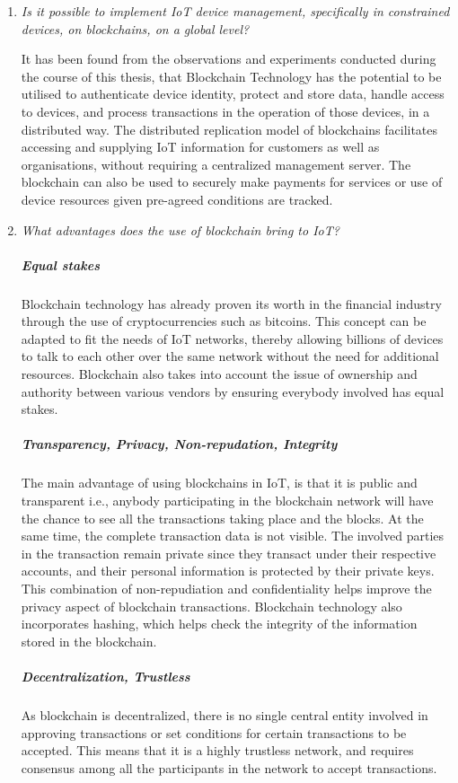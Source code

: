 \documentclass[english]{tktltiki}
\begin{document}
\begin{enumerate}
\item \textit{Is it possible to implement IoT device management, specifically in constrained devices, on blockchains, on a global level?}\newline

It has been found from the observations and experiments conducted during the course of this thesis, that Blockchain Technology has the potential to be utilised to authenticate device identity, protect and store data, handle access to devices, and process transactions in the operation of those devices, in a distributed way. The distributed replication model of blockchains facilitates accessing and supplying IoT information for customers as well as organisations, without requiring a centralized management server. The blockchain can also be used to securely make payments for services or use of device resources given pre-agreed conditions are tracked. 

\item \textit{What advantages does the use of blockchain bring to IoT?}

\subparagraph{Equal stakes} Blockchain technology has already proven its worth in the financial industry through the use of cryptocurrencies such as bitcoins. This concept can be adapted to fit the needs of IoT networks, thereby allowing billions of devices to talk to each other over the same network without the need for additional resources. Blockchain also takes into account the issue of ownership and authority between various vendors by ensuring everybody involved has equal stakes.

\subparagraph{Transparency, Privacy, Non-repudation, Integrity} The main advantage of using blockchains in IoT, is that it is public and transparent i.e., anybody participating in the blockchain network will have the chance to see all the transactions taking place and the blocks. At the same time, the complete transaction data is not visible. The involved parties in the transaction remain private since they transact under their respective accounts, and their personal information is protected by their private keys. This combination of non-repudiation and confidentiality helps improve the privacy aspect of blockchain transactions. Blockchain technology also incorporates hashing, which helps check the integrity of the information stored in the blockchain.

\subparagraph{Decentralization, Trustless} As blockchain is decentralized, there is no single central entity involved in approving transactions or set conditions for certain transactions to be accepted. This means that it is a highly trustless network, and requires consensus among all the participants in the network to accept transactions.


\end{enumerate}
\end{document}
